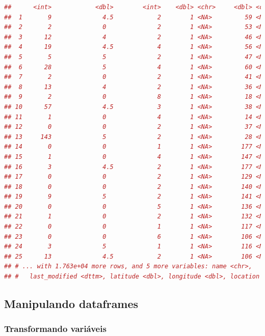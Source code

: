\documentclass{article}
\begin{document}
\begin{lstlisting}[language=R]
##      <int>            <dbl>        <int>    <dbl> <chr>     <dbl> <chr>  
##  1       9              4.5            2        1 <NA>         59 <NA>   
##  2       2              0              2        1 <NA>         53 <NA>   
##  3      12              4              2        1 <NA>         46 <NA>   
##  4      19              4.5            4        1 <NA>         56 <NA>   
##  5       5              5              2        1 <NA>         47 <NA>   
##  6      28              5              4        1 <NA>         60 <NA>   
##  7       2              0              2        1 <NA>         41 <NA>   
##  8      13              4              2        1 <NA>         36 <NA>   
##  9       2              0              8        1 <NA>         18 <NA>   
## 10      57              4.5            3        1 <NA>         38 <NA>   
## 11       1              0              4        1 <NA>         14 <NA>   
## 12       0              0              2        1 <NA>         37 <NA>   
## 13     143              5              2        1 <NA>         28 <NA>   
## 14       0              0              1        1 <NA>        177 <NA>   
## 15       1              0              4        1 <NA>        147 <NA>   
## 16       3              4.5            2        1 <NA>        177 <NA>   
## 17       0              0              2        1 <NA>        129 <NA>   
## 18       0              0              2        1 <NA>        140 <NA>   
## 19       9              5              2        1 <NA>        141 <NA>   
## 20       0              0              5        1 <NA>        136 <NA>   
## 21       1              0              2        1 <NA>        132 <NA>   
## 22       0              0              1        1 <NA>        117 <NA>   
## 23       0              0              6        1 <NA>        106 <NA>   
## 24       3              5              1        1 <NA>        116 <NA>   
## 25      13              4.5            2        1 <NA>        106 <NA>   
## # ... with 1.763e+04 more rows, and 5 more variables: name <chr>,
## #   last_modified <dttm>, latitude <dbl>, longitude <dbl>, location <chr>
\end{lstlisting}

\newpage

\subsection{Manipulando dataframes}
\subsubsection{Transformando variáveis}
\end{document}
